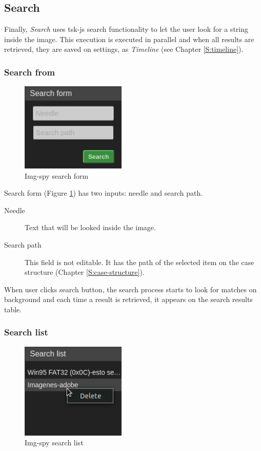 \subsection{Search}

Finally, \textit{Search} uses tsk-js search functionality to let the
user look for a string inside the image. This execution is executed in parallel
and when all results are retrieved, they are saved on settings, as
\textit{Timeline} (see Chapter \ref{S:timeline}).

\subsubsection{Search from}

\begin{figure}
	\includegraphics[width=5cm]
	{./figures/search-form.png}
	\centering
	\caption{Img-spy search form}
	\label{F:img-spy-search-form}
\end{figure}

Search form (Figure \ref{F:img-spy-search-form}) has two inputs: needle and
search path.

\begin{description}
	\item[Needle] Text that will be looked inside the image.
	\item[Search path] This field is not editable. It has the path of the
	selected item on the case structure (Chapter \ref{S:case-structure}).
\end{description}

When user clicks search button, the search process starts to look for matches
on background and each time a result is retrieved, it appears on the search
results table.

\subsubsection{Search list}

\begin{figure}
	\includegraphics[width=5cm]
	{./figures/search-list.png}
	\centering
	\caption{Img-spy search list}
	\label{F:img-spy-search-list}
\end{figure}

